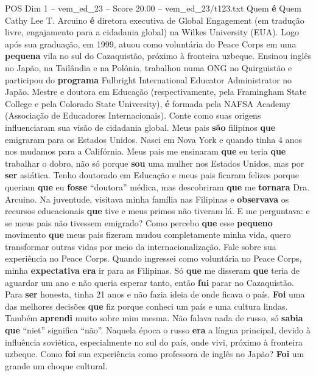 \begin{textsample}{POS Dim 1 – vem\_ed\_23 – Score 20.00 – vem\_ed\_23/t123.txt}  \label{ex:f1_pos_139}
Quem \textbf{é} Quem Cathy Lee T.
Arcuino \textbf{é} diretora executiva de Global Engagement (em tradução livre, engajamento para a cidadania global) na Wilkes University (EUA).
Logo após sua graduação, em 1999, atuou como voluntária do Peace Corps em uma \textbf{pequena} vila no sul do Cazaquistão, próximo à fronteira uzbeque.
Ensinou inglês no Japão, na Tailândia e na Polônia, trabalhou numa ONG no Quirguistão e participou do \textbf{programa} Fulbright International Educator Administrator no Japão.
Mestre e doutora em Educação (respectivamente, pela Framingham State College e pela Colorado State University), \textbf{é} formada pela NAFSA Academy (Associação de Educadores Internacionais).
Conte como suas origens influenciaram sua visão de cidadania global.
Meus pais \textbf{são} filipinos \textbf{que} emigraram para os Estados Unidos.
Nasci em Nova York e quando tinha 4 anos nos mudamos para a Califórnia.
Meus pais me ensinaram \textbf{que} eu teria \textbf{que} trabalhar o dobro, não só porque \textbf{sou} uma mulher nos Estados Unidos, mas por \textbf{ser} asiática.
Tenho doutorado em Educação e meus pais ficaram felizes porque queriam \textbf{que} eu \textbf{fosse} “doutora” médica, mas descobriram \textbf{que} me \textbf{tornara} Dra.
Arcuino.
Na juventude, visitava minha família nas Filipinas e \textbf{observava} os recursos educacionais \textbf{que} tive e meus primos não tiveram lá.
E me perguntava: e se meus pais não tivessem emigrado?
Como percebo \textbf{que} esse \textbf{pequeno} movimento \textbf{que} meus pais fizeram mudou completamente minha vida, quero transformar outras vidas por meio da internacionalização.
Fale sobre sua experiência no Peace Corps.
Quando ingressei como voluntária no Peace Corps, minha \textbf{expectativa} \textbf{era} ir para as Filipinas.
Só \textbf{que} me disseram \textbf{que} teria de aguardar um ano e não queria esperar tanto, então \textbf{fui} parar no Cazaquistão.
Para \textbf{ser} honesta, tinha 21 anos e não fazia ideia de onde ficava o país. \textbf{Foi} uma das melhores decisões \textbf{que} fiz porque conheci um país e uma cultura lindas.
Também \textbf{aprendi} muito sobre mim mesma.
Não falava nada de russo, só \textbf{sabia} \textbf{que} “niet” significa “não”.
Naquela época o russo \textbf{era} a língua principal, devido à influência soviética, especialmente no sul do país, onde vivi, próximo à fronteira uzbeque.
Como \textbf{foi} sua experiência como professora de inglês no Japão? \textbf{Foi} um grande um choque cultural.

\end{textsample}
